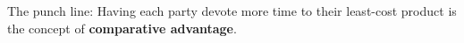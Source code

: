 \begin{enumerate}
\begin{enumerate}
    \end{enumerate}


The punch line: Having each party devote more time to their least-cost product is the concept of \textbf{comparative advantage}.


    \end{enumerate}



